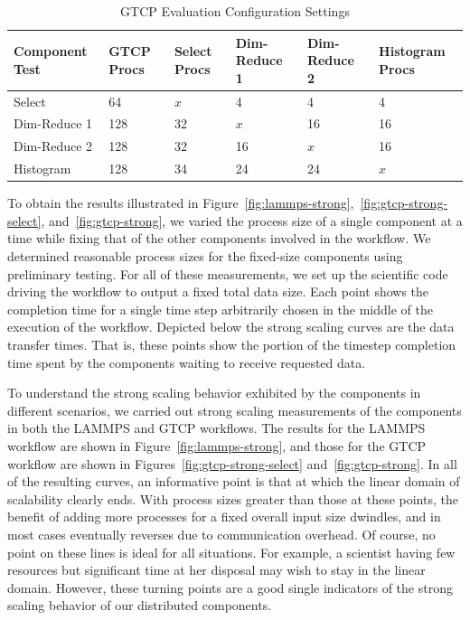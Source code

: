 \documentclass[conference]{IEEEtran}
\begin{document}

\begin{table}[tbp]
\centering
\caption{GTCP Evaluation Configuration Settings}
\label{tab:eval-strong-gtcp}
\vspace{-0.15in}
\begin{tabular}{|l|l|l|l|l|l|}
\hline
Component Test & GTCP Procs & Select Procs & Dim-Reduce 1 & Dim-Reduce 2 & Histogram Procs \\
\hline
Select & 64 & $x$ & 4 & 4 & 4\\
\hline
Dim-Reduce 1 & 128 & 32 & $x$ & 16 & 16\\
\hline
Dim-Reduce 2 & 128 & 32 & 16 & $x$ & 16\\
\hline
Histogram & 128 & 34 & 24 & 24 & $x$\\
\hline
\end{tabular}
\end{table}


To obtain the results illustrated in
Figure~\ref{fig:lammps-strong},~\ref{fig:gtcp-strong-select},
and~\ref{fig:gtcp-strong}, we varied the process size of a single component at
a time while fixing that of the other components involved in the workflow.  We
determined reasonable process sizes for the fixed-size components using
preliminary testing. For all of these measurements, we set up the scientific
code driving the workflow to output a fixed total data size. Each point shows
the completion time for a single time step arbitrarily chosen in the middle of
the execution of the workflow. Depicted below the strong scaling curves are the
data transfer times. That is, these points show the portion of the timestep
completion time spent by the components waiting to receive requested data.

To understand the strong scaling behavior exhibited by the components in
different scenarios, we carried out strong scaling measurements of the
components in both the LAMMPS and GTCP workflows. The results for the LAMMPS
workflow are shown in Figure~\ref{fig:lammps-strong}, and those for the GTCP
workflow are shown in Figures~\ref{fig:gtcp-strong-select}
and~\ref{fig:gtcp-strong}. In all of the resulting curves, an informative point
is that at which the linear domain of scalability clearly ends. With process
sizes greater than those at these points, the benefit of adding more processes
for a fixed overall input size dwindles, and in most cases eventually reverses
due to communication overhead. Of course, no point on these lines is ideal for
all situations. For example, a scientist having few resources but significant
time at her disposal may wish to stay in the linear domain. However, these
turning points are a good single indicators of the strong scaling behavior of
our distributed components.
\end{document}
